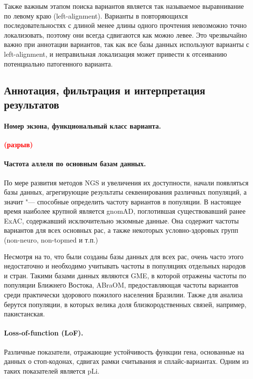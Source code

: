 \documentclass[a4paper,12pt]{article}
\newcommand{\spacing}{\textcolor{red}{\textbf{(разрыв)}}}
\begin{document}
Также важным этапом поиска вариантов является так называемое выравнивание по левому краю (left-alignment).
Варианты в повторяющихся последовательностях с длиной менее длины одного прочтения невозможно точно локализовать, поэтому они всегда сдвигаются как можно левее.
Это чрезвычайно важно при аннотации вариантов, так как все базы данных используют варианты с left-alignment, и неправильная локализация может привести к отсеиванию потенциально патогенного варианта.

\subsection{Аннотация, фильтрация и интерпретация результатов}

\paragraph{Номер экзона, функциональный класс варианта.}
\spacing

\paragraph{Частота аллеля по основным базам данных.}
По мере развития методов NGS и увеличения их доступности, начали появляться базы данных, агрегирующие результаты секвенирования различных популяций, а значит "--- способные определить частоту вариантов в популяции.
В настоящее время наиболее крупной является gnomAD\cite{gnomad}, поглотившая существовавший ранее ExAC, содержавший исключительно экзомные данные.
Она содержит частоты вариантов для всех основных рас, а также некоторых условно-здоровых групп (non-neuro, non-topmed и т.п.)

Несмотря на то, что были созданы базы данных для всех рас, очень часто этого недостаточно и необходимо учитывать частоты в популяциях отдельных народов и стран.
Такими базами данных являются GME\cite{gme}, в которой отражены частоты по популяции Ближнего Востока, ABraOM\cite{abraom}, предоставляющая частоты вариантов среди практически здорового пожилого населения Бразилии.
Также для анализа берутся популяции, в которых велика доля близкородственных связей, например, пакистанская\cite{saleheen}.

\paragraph{Loss-of-function (LoF).}
Различные показатели, отражающие устойчивость функции гена, основанные на данных о стоп-кодонах, сдвигах рамки считывания и сплайс-вариантах.
Одним из таких показателей является pLi.
\end{document}

